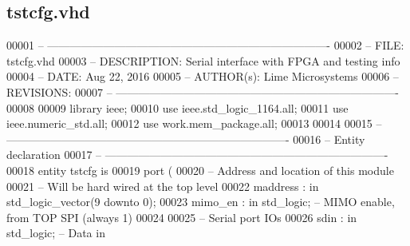 \subsection{tstcfg.\+vhd}
\label{self__test_2tstcfg_8vhd_source}

\begin{DoxyCode}
00001 \textcolor{keyword}{-- ---------------------------------------------------------------------------- }
00002 \textcolor{keyword}{-- FILE:    tstcfg.vhd}
00003 \textcolor{keyword}{-- DESCRIPTION: Serial interface with FPGA and testing info}
00004 \textcolor{keyword}{-- DATE:    Aug 22, 2016}
00005 \textcolor{keyword}{-- AUTHOR(s):   Lime Microsystems}
00006 \textcolor{keyword}{-- REVISIONS:   }
00007 \textcolor{keyword}{-- ---------------------------------------------------------------------------- }
00008 
00009 \textcolor{vhdlkeyword}{library }\textcolor{keywordflow}{ieee};
00010 \textcolor{vhdlkeyword}{use }ieee.std\_logic\_1164.\textcolor{keywordflow}{all};
00011 \textcolor{vhdlkeyword}{use }ieee.numeric\_std.\textcolor{keywordflow}{all};
00012 \textcolor{vhdlkeyword}{use }work.mem_package.\textcolor{keywordflow}{all};
00013 
00014 
00015 \textcolor{keyword}{-- ----------------------------------------------------------------------------}
00016 \textcolor{keyword}{-- Entity declaration}
00017 \textcolor{keyword}{-- ----------------------------------------------------------------------------}
00018 \textcolor{keywordflow}{entity }tstcfg \textcolor{keywordflow}{is}
00019     \textcolor{keywordflow}{port} \textcolor{vhdlchar}{(}
00020 \textcolor{keyword}{        -- Address and location of this module}
00021 \textcolor{keyword}{        -- Will be hard wired at the top level}
00022         \textcolor{vhdlchar}{maddress}                    \textcolor{vhdlchar}{:} \textcolor{keywordflow}{in} \textcolor{comment}{std\_logic\_vector}\textcolor{vhdlchar}{(}\textcolor{vhdllogic}{}\textcolor{vhdllogic}{9} \textcolor{keywordflow}{downto} \textcolor{vhdllogic}{}\textcolor{vhdllogic}{0}\textcolor{vhdlchar}{)};
00023         \textcolor{vhdlchar}{mimo_en}                 \textcolor{vhdlchar}{:} \textcolor{keywordflow}{in} \textcolor{comment}{std\_logic};\textcolor{keyword}{ -- MIMO enable, from TOP SPI (always 1)}
00024     
00025 \textcolor{keyword}{        -- Serial port IOs}
00026         \textcolor{vhdlchar}{sdin}                        \textcolor{vhdlchar}{:} \textcolor{keywordflow}{in} \textcolor{comment}{std\_logic};\textcolor{keyword}{     -- Data in}

\end{DoxyCode}
